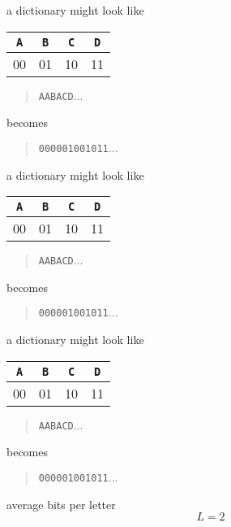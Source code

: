 \documentclass{beamer}
\newcommand{\crish}{\color{reddish}}
\newcommand{\cbla}{\color{black}}
\newcommand{\cred}{\color{red}}
\newcommand{\cblu}{\color{blue}}
\newcommand{\cgre}{\color{green}}
\newcommand{\letter}[1]{\color{blue}\texttt{#1}\color{black}}
\newcommand{\binary}[1]{\color{red}\texttt{#1}\color{black}}
\begin{document}
\begin{frame}{a dictionary might look like}
\begin{center}
\begin{tabular}{cccc}
\letter{A}&\letter{B}&\letter{C}&\letter{D}\\
\hline\cred
00&\cred 01&\cred 10&\cred 11
\cbla\end{tabular}
\end{center}
  \begin{quote}
    \letter{AABA\cgre C\cblu{}D}$\ldots$
  \end{quote}
  becomes
    \begin{quote}
    \binary{00000100\cgre 10\cred{}11}$\ldots$
    \end{quote}
\end{frame}


\begin{frame}{a dictionary might look like}
\begin{center}
\begin{tabular}{cccc}
\letter{A}&\letter{B}&\letter{C}&\letter{D}\\
\hline\cred
00&\cred 01&\cred 10&\cred 11
\cbla\end{tabular}
\end{center}
  \begin{quote}
    \letter{AABAC\cgre D\cblu{}}$\ldots$
  \end{quote}
  becomes
    \begin{quote}
    \binary{0000010010\cgre 11\cred{}}$\ldots$
    \end{quote}
\end{frame}


\begin{frame}{a dictionary might look like}
\begin{center}
\begin{tabular}{cccc}
\letter{A}&\letter{B}&\letter{C}&\letter{D}\\
\hline\cred
00&\cred 01&\cred 10&\cred 11
\cbla\end{tabular}
\end{center}
  \begin{quote}
    \letter{AABACD}$\ldots$
  \end{quote}
  becomes
    \begin{quote}
    \binary{000001001011}$\ldots$
    \end{quote}
\end{frame}

\begin{frame}{average bits per letter}
  \crish
  $$
  L=2
  $$
  \cbla
\end{frame}
\end{document}
